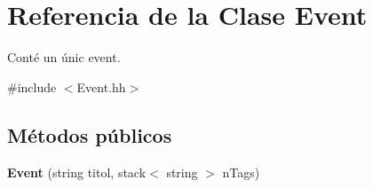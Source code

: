 \hypertarget{class_event}{}\section{Referencia de la Clase Event}
\label{class_event}


Conté un únic event.  




{\ttfamily \#include $<$Event.\+hh$>$}

\subsection*{Métodos públicos}
\begin{DoxyCompactItemize}
\item 
\hypertarget{class_event_abf070291c8f16b4fb208ff747461c4ec}{}{\bfseries Event} (string titol, stack$<$ string $>$ n\+Tags)\label{class_event_abf070291c8f16b4fb208ff747461c4ec}


\end{DoxyCompactItemize}
